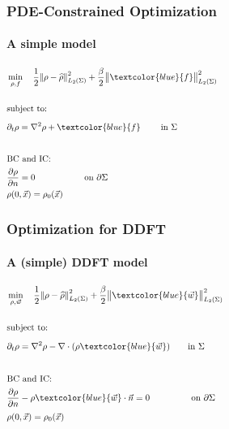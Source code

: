 \documentclass[aspectratio=169,xcolor=dvipsnames]{beamer}
\begin{document}
\begin{frame}
	\frametitle{PDE-Constrained Optimization}
	\framesubtitle{A simple model}
	\begin{align*}
		&\min_{\rho,f} \quad \frac{1}{2}\norm{\rho- \widehat{\rho}}_{L_2(\Sigma)}^2 + \frac{\beta}{2} \norm{\textcolor{blue}{f}}_{L_2(\Sigma)}^2\\
		\\
		&\text{subject to:}
		\\
		& \partial_t \rho = \nabla^2 \rho + \textcolor{blue}{f} \qquad \text{ in    } \Sigma   \phantom{ \qquad \qquad \qquad \qquad\nabla \cdot (\rho \vec{w})+{\nabla \cdot \int_\Omega \rho(\vec{x}) \rho(\vec{x}') \nabla V_2(|\vec{x}-\vec{x}\hspace{0.2em}'|)d\vec{x}'} }\\
		\\
		&\text{BC } \text{and IC:}\\
		&\frac{\partial \rho}{\partial n}  = 0 \quad \ \ \qquad \qquad \text{on   } \partial \Sigma   \\
		&\rho(0,\vec{x}) = \rho_0(\vec{x})
	\end{align*}
	
\end{frame}
\begin{frame}
	\frametitle{Optimization for DDFT}
	\framesubtitle{A (simple) DDFT model}
	\begin{align*}
	&\min_{\rho,\vec{w}} \quad \frac{1}{2}\norm{\rho- \widehat{\rho}}_{L_2(\Sigma)}^2 + \frac{\beta}{2} \norm{ \textcolor{blue}{\vec{w}}}_{L_2(\Sigma)}^2\\
	\\
	&\text{subject to:}
	\\
	&{ \partial_t \rho = \nabla^2 \rho - \nabla \cdot (\rho  \textcolor{blue}{\vec{w}})} \qquad { \text{in    } \Sigma \phantom{+\nabla \cdot \int_\Omega \rho(\vec{x}) \rho(\vec{x}\hspace{0.2em}') \nabla V_2(|\vec{x}-\vec{x}\hspace{0.2em}'|)d\vec{x}\hspace{0.2em}'} }\qquad \qquad \qquad \qquad\\
	\\
	&{\text{BC } \text{and IC:}}\\
	&{\frac{\partial \rho}{\partial n} - \rho  \textcolor{blue}{\vec{w}} \cdot \vec{n} = 0 \ \ \qquad \qquad \text{on   } \partial \Sigma  }\phantom{+ \int_\Omega \rho(\vec{x}) \rho(\vec{x}\hspace{0.2em}')  \frac{ \partial  V_2}{\partial n}(|\vec{x}-\vec{x}\hspace{0.2em}'|)d\vec{x}\hspace{0.2em}'} { \quad \  } \\
	&{\rho(0,\vec{x}) = \rho_0(\vec{x})} 
\end{align*}
	
\end{frame}
\end{document}
